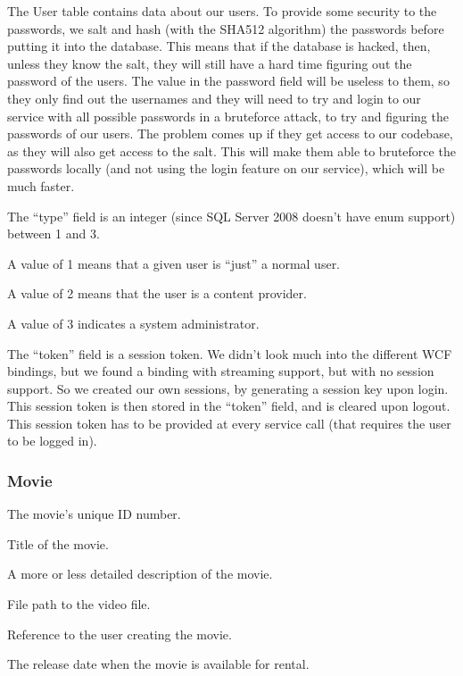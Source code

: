The User table contains data about our users. To provide some security to the passwords, we salt and hash (with the SHA512 algorithm) the passwords before putting it into the database. This means that if the database is hacked, then, unless they know the salt, they will still have a hard time figuring out the password of the users. The value in the password field will be useless to them, so they only find out the usernames and they will need to try and login to our service with all possible passwords in a bruteforce attack, to try and figuring the passwords of our users.
The problem comes up if they get access to our codebase, as they will also get access to the salt. This will make them able to bruteforce the passwords locally (and not using the login feature on our service), which will be much faster.

The ``type'' field is an integer (since SQL Server 2008 doesn't have enum support) between 1 and 3. 

\begin{description}\addtolength{\itemsep}{-7pt}
\item[type 1] A value of 1 means that a given user is ``just'' a normal user.
\item[type 2] A value of 2 means that the user is a content provider.
\item[type 3] A value of 3 indicates a system administrator.
\end{description}

The ``token'' field is a session token. We didn't look much into the different WCF bindings, but we found a binding with streaming support, but with no session support. So we created our own sessions, by generating a session key upon login. This session token is then stored in the ``token'' field, and is cleared upon logout. This session token has to be provided at every service call (that requires the user to be logged in).

\subsubsection{Movie}
\label{Design_Database_Tables_Movie}

\begin{description}\addtolength{\itemsep}{-7pt}
\item[movie\_id] The movie's unique ID number.
\item[title] Title of the movie.
\item[description] A more or less detailed description of the movie.
\item[file\_path] File path to the video file.
\item[owner\_id] Reference to the user creating the movie.
\item[release\_date] The release date when the movie is available for rental.
\end{description}

